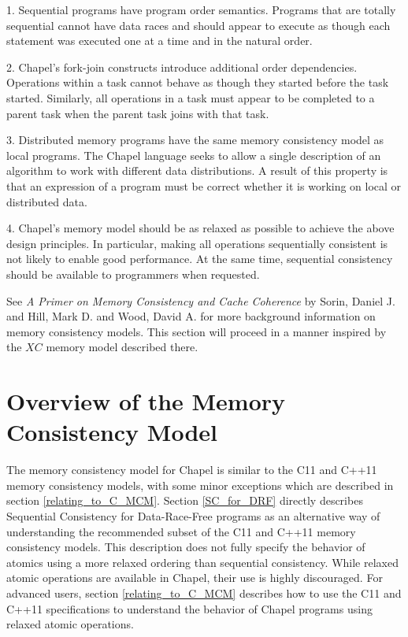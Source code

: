 1. Sequential programs have  program order semantics.
   Programs that are totally sequential cannot have data races and should
   appear to execute as though each statement was executed one at a time and in
   the natural order.

2. Chapel's fork-join constructs introduce additional order dependencies.
   Operations within a task cannot behave as though they started before the
   task started. Similarly, all operations in a task must appear to be
   completed to a parent task when the parent task joins with that task.

3. Distributed memory programs have the same memory consistency model as local
   programs. The Chapel language seeks to allow a single description of an
   algorithm to work with different data distributions. A result of this
   property is that an expression of a program must be correct whether it is
   working on local or distributed data.

4. Chapel's memory model should be as relaxed as possible to achieve the above
   design principles. In particular, making all operations sequentially
   consistent is not likely to enable good performance. At the same time,
   sequential consistency should be available to programmers when requested.

See \textit{A Primer on Memory Consistency and Cache Coherence} by Sorin,
Daniel J. and Hill, Mark D. and Wood, David A. for more background information
on memory consistency models. This section will proceed in a manner inspired by
the $XC$ memory model described there.

\section{Overview of the Memory Consistency Model}

The memory consistency model for Chapel is similar to the C11 and C++11 memory
consistency models, with some minor exceptions which are described in section
\ref{relating_to_C_MCM}. Section \ref{SC_for_DRF} directly describes Sequential
Consistency for Data-Race-Free programs as an alternative way of understanding
the recommended subset of the C11 and C++11 memory consistency models. This
description does not fully specify the behavior of atomics using a more relaxed
ordering than sequential consistency. While relaxed atomic operations are
available in Chapel, their use is highly discouraged. For advanced users,
section \ref{relating_to_C_MCM} describes how to use the C11 and C++11
specifications to understand the behavior of Chapel programs using relaxed
atomic operations.

